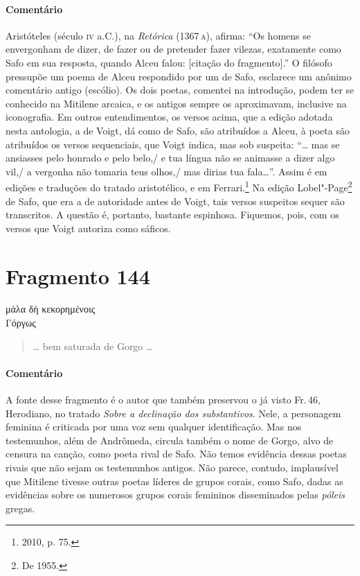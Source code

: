 
{\paragraph{Comentário} Aristóteles (século \textsc{iv} a.C.), na \textit{Retórica} (1367\,\textsc{a}), afirma: ``Os homens se envergonham de dizer, de fazer ou de pretender fazer vilezas, exatamente \EP[2]
como Safo em sua resposta, quando Alceu falou: [citação do fragmento].''
O filósofo pressupõe um poema de Alceu respondido por um de Safo, esclarece um anônimo comentário antigo (escólio). Os
dois poetas, comentei na introdução, podem ter se conhecido na Mitilene arcaica, e
os antigos sempre os aproximavam, inclusive na iconografia.
Em outros entendimentos, os versos acima, que a edição adotada nesta antologia, a de Voigt, dá como de Safo, são atribuídos a Alceu, à poeta são atribuídos os versos sequenciais, que Voigt indica, mas sob suspeita: ``\ldots{} mas se ansiasses pelo honrado e pelo belo,/ e tua língua não se animasse a dizer algo vil,/ a vergonha não tomaria teus olhos,/ mas dirias tua fala\ldots{}''. Assim é em edições e traduções do tratado aristotélico, e em Ferrari.\footnote{2010, p. 75.} Na edição Lobel"-Page\footnote{De 1955.} de Safo, que era a de autoridade antes de Voigt, tais versos suspeitos sequer são transcritos. A questão é, portanto, bastante espinhosa. Fiquemos, pois, com os versos que Voigt autoriza como sáficos.}

\pagebreak
\section{Fragmento 144}

\begin{gkverse}
μάλα δὴ κεκορημένοις\\
Γόργως
\end{gkverse}

\begin{verse}
\ldots{} bem saturada de Gorgo \ldots{}
\end{verse}

\medskip

{\paragraph{Comentário} A fonte desse fragmento é o autor que também preservou o já visto Fr.\,46, Herodiano, no tratado
\textit{Sobre a declinação dos substantivos}. Nele, a personagem feminina é
criticada por uma voz sem qualquer identificação. Mas nos testemunhos, além de Andrômeda, circula também o nome de Gorgo, alvo de censura na canção, como poeta rival de Safo. Não temos evidência dessas poetas rivais que não sejam os testemunhos antigos. Não parece, contudo, implausível que Mitilene tivesse outras poetas líderes de grupos corais, como Safo, dadas as evidências sobre os numerosos  grupos corais femininos disseminados pelas \textit{póleis} gregas.}


